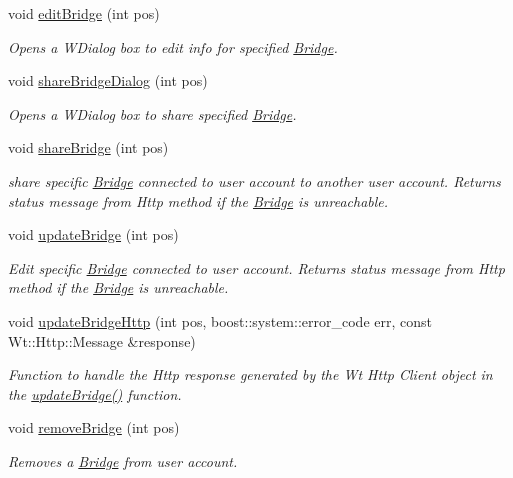 \begin{DoxyCompactItemize}
void \hyperlink{classBridgeScreenWidget_a01197d21b3419e805f6b80730968125c}{edit\+Bridge} (int pos)
\begin{DoxyCompactList}\small\item\em Opens a W\+Dialog box to edit info for specified \hyperlink{classBridge}{Bridge}. \end{DoxyCompactList}\item 
void \hyperlink{classBridgeScreenWidget_ab9e34361cb5786cfdb3cdbf1cabd2373}{share\+Bridge\+Dialog} (int pos)
\begin{DoxyCompactList}\small\item\em Opens a W\+Dialog box to share specified \hyperlink{classBridge}{Bridge}. \end{DoxyCompactList}\item 
void \hyperlink{classBridgeScreenWidget_aca0e0c21ce0493f04df0dfffc961c0c0}{share\+Bridge} (int pos)
\begin{DoxyCompactList}\small\item\em share specific \hyperlink{classBridge}{Bridge} connected to user account to another user account. Returns status message from Http method if the \hyperlink{classBridge}{Bridge} is unreachable. \end{DoxyCompactList}\item 
void \hyperlink{classBridgeScreenWidget_a0a0aee92cd4bb6f46bca10c04ea06436}{update\+Bridge} (int pos)
\begin{DoxyCompactList}\small\item\em Edit specific \hyperlink{classBridge}{Bridge} connected to user account. Returns status message from Http method if the \hyperlink{classBridge}{Bridge} is unreachable. \end{DoxyCompactList}\item 
void \hyperlink{classBridgeScreenWidget_a29b1325ddad5cca2e6115aca2d015858}{update\+Bridge\+Http} (int pos, boost\+::system\+::error\+\_\+code err, const Wt\+::\+Http\+::\+Message \&response)
\begin{DoxyCompactList}\small\item\em Function to handle the Http response generated by the Wt Http Client object in the \hyperlink{classBridgeScreenWidget_a0a0aee92cd4bb6f46bca10c04ea06436}{update\+Bridge()} function. \end{DoxyCompactList}\item 
void \hyperlink{classBridgeScreenWidget_aaec5d0b09c39ef00ba0c0ab89948106d}{remove\+Bridge} (int pos)
\begin{DoxyCompactList}\small\item\em Removes a \hyperlink{classBridge}{Bridge} from user account. \end{DoxyCompactList}\end{DoxyCompactItemize}
